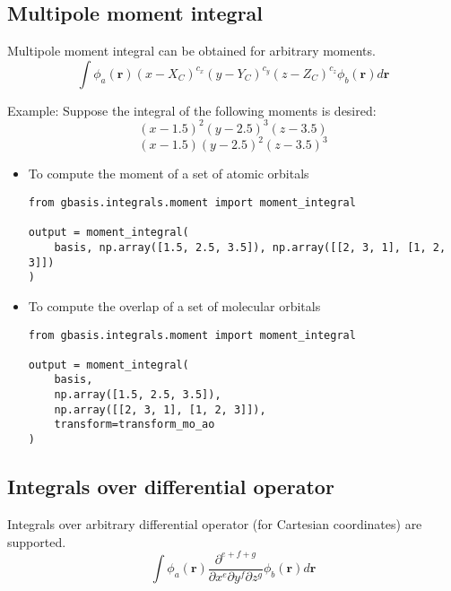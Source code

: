 \documentclass[letterpaper]{article}
\begin{document}
\subsection{Multipole moment integral}
Multipole moment integral can be obtained for arbitrary moments.
\begin{equation}
  \label{eq:multipole}
  \int \phi_a (\mathbf{r}) (x - X_C)^{c_x} (y - Y_C)^{c_y} (z - Z_C)^{c_z} \phi_b (\mathbf{r}) d\mathbf{r}
\end{equation}

Example:
Suppose the integral of the following moments is desired:
\begin{equation}
  (x - 1.5)^2 (y - 2.5)^3 (z - 3.5)
\end{equation}
\begin{equation}
  (x - 1.5) (y - 2.5)^2 (z - 3.5)^3
\end{equation}
\begin{itemize}
\item To compute the moment of a set of atomic orbitals
  \begin{lstlisting}[xleftmargin=-25pt]
from gbasis.integrals.moment import moment_integral

output = moment_integral(
    basis, np.array([1.5, 2.5, 3.5]), np.array([[2, 3, 1], [1, 2, 3]])
)
\end{lstlisting}
\item To compute the overlap of a set of molecular orbitals
  \begin{lstlisting}[xleftmargin=-25pt]
from gbasis.integrals.moment import moment_integral

output = moment_integral(
    basis,
    np.array([1.5, 2.5, 3.5]),
    np.array([[2, 3, 1], [1, 2, 3]]),
    transform=transform_mo_ao
)
\end{lstlisting}
\end{itemize}

\subsection{Integrals over differential operator}
Integrals over arbitrary differential operator (for Cartesian coordinates) are
supported.
\begin{equation}
  \int
  \phi_a(\mathbf{r}) \frac{\partial^{e+f+g}}{\partial x^e \partial y^f \partial z^g} \phi_b(\mathbf{r})
  d\mathbf{r}
\end{equation}
\end{document}
